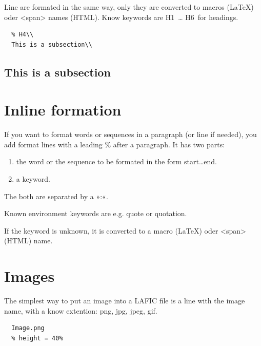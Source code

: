 \documentclass{article}
\begin{document}
Line are formated in the same way, only they are converted
to macros (LaTeX) oder <span> names (HTML). Know keywords
are H1~… H6~for headings.

\begin{verbatim}
  % H4\\
  This is a subsection\\

\end{verbatim}

\subsection{This is a subsection}

\section{Inline formation}

If you want to format words or sequences in a paragraph (or
line if needed), you add format lines with a leading \% after
a paragraph. It has two parts:

\begin{enumerate}

\item the word or the sequence to be formated in the form
  start…end. 
\item a keyword.

\end{enumerate}

The both are separated by a »:«.

Known environment keywords are e.g. quote or quotation.

If the keyword is unknown, it is converted to a macro
(LaTeX) oder <span> (HTML) name.

\section{Images}

The simplest way to put an image into a LAFIC file is a
line with the image name, with a know extention: png, jpg,
jpeg, gif.

\begin{verbatim}
  Image.png
  % height = 40%

\end{verbatim}
\end{document}
